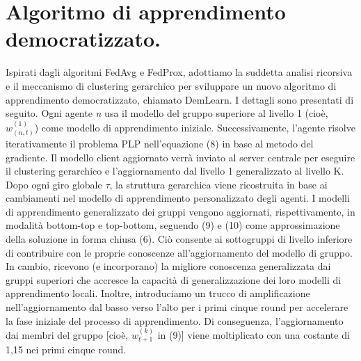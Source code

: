 \section{Algoritmo di apprendimento democratizzato.}

Ispirati dagli algoritmi FedAvg e FedProx, adottiamo la
suddetta analisi ricorsiva e il meccanismo di clustering gerarchico per sviluppare un nuovo algoritmo di apprendimento democratizzato, chiamato DemLearn. I dettagli sono presentati di seguito. Ogni agente \textsl{n} usa il modello del gruppo superiore al livello 1 (cioè, $w_{(n,t)}^{(1)}$) come modello di apprendimento iniziale. Successivamente, l'agente risolve iterativamente il problema PLP nell'equazione (8) in base al metodo del gradiente.
Il modello client aggiornato verrà inviato al server centrale per eseguire il clustering gerarchico e l'aggiornamento dal livello 1 generalizzato al livello K. Dopo ogni giro globale $\tau$, la struttura gerarchica viene ricostruita in base ai cambiamenti nel modello di apprendimento personalizzato degli agenti. I modelli di apprendimento generalizzato dei gruppi vengono aggiornati, rispettivamente, in modalità bottom-top e top-bottom, seguendo (9) e (10) come approssimazione della soluzione in forma chiusa (6). Ciò consente ai sottogruppi di livello inferiore di contribuire con le proprie conoscenze all'aggiornamento del modello di gruppo. In cambio, ricevono (e incorporano) la migliore conoscenza generalizzata dai gruppi superiori che accresce la capacità di generalizzazione dei loro modelli di apprendimento locali. Inoltre, introduciamo un trucco di amplificazione nell'aggiornamento dal basso verso l'alto per i primi cinque round per accelerare la fase iniziale del processo di apprendimento. Di conseguenza, l'aggiornamento dai membri del gruppo [cioè, $w_{t+1}^{(k)}$ in (9)] viene moltiplicato con una costante di 1,15 nei primi cinque round.\\\\


